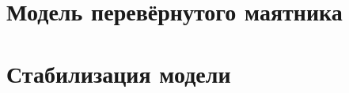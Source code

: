 




\tableofcontents
\clearpage


\clearpage
\section{Модель перевёрнутого маятника}




\clearpage
\section{Стабилизация модели}





\clearpage
\begin{thebibliography}{9}

\end{thebibliography}
